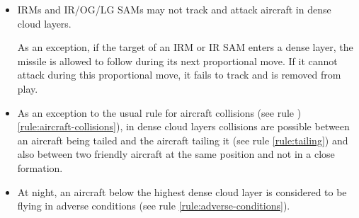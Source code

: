 \begin{advancedrules}
{\begin{itemize}
\begin{itemize}
\item 
Aircraft and ground units in a dense cloud layer may not be visually sighted.
\end{itemize}

As an exception, during the day, an aircraft being tailed (see rule \ref{rule:tailing}) that enters a dense cloud layer continues to be sighted by the tailing aircraft for as long as the latter continues to tail. The tailing aircraft can potentially attack the aircraft being tailed with guns.

The same limitations apply to the use of VAS, IRSTS, TV/IR optics, laser designators, laser spot trackers, IRM and IR/OG/LG SAM launches, OG/LG SAM tracking, AAA units not stacked with a FCR or with integral W-type FCR, and RG/RS/BG/BS weapons.

In particular, aircraft in dense cloud layer may not launch IRMs or be the target of IRMs, even with radar assist (see rule \ref{rule:irm-radar}).

\item{} IRMs and IR/OG/LG SAMs may not track and attack aircraft in dense cloud layers. 

As an exception, if the target of an IRM or IR SAM enters a dense layer, the missile is allowed to follow during its next proportional move. If it cannot attack during this proportional move, it fails to track and is removed from play.

\item{} As an exception to the usual rule for aircraft collisions (see rule )\ref{rule:aircraft-collisions}), in dense cloud layers collisions are possible between an aircraft being tailed and the aircraft tailing it (see rule \ref{rule:tailing}) and also between two friendly aircraft at the same position and not in a close formation.

\item{} At night, an aircraft below the highest dense cloud layer is considered to be flying in adverse conditions (see rule \ref{rule:adverse-conditions}).

\end{itemize}
}

\end{advancedrules}
